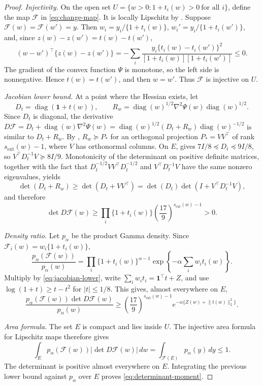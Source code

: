 \documentclass[11pt]{article}
\theoremstyle{definition}
\theoremstyle{remark}
\DeclareMathOperator{\diag}{diag}
\newcommand{\one}{\bm 1}
\newcommand{\norm}[1]{\lVert #1\rVert}
\newcommand{\abs}[1]{\lvert #1\rvert}
\newcommand{\sext}{s_{\mathrm{ext}}}
\begin{document}
\begin{proof}
\emph{Injectivity.}  On the open set
$U=\{w>0:1+t_i(w)>0\ \text{for all }i\}$, define the map $\mathcal F$ in
\eqref{eq:change-map}.  It is locally Lipschitz by .
Suppose $\mathcal F(w)=\mathcal F(w')=y$.  Then $w_i=y_i/\{1+t_i(w)\}$,
$w_i'=y_i/\{1+t_i(w')\}$, and, since $z(w)-z(w')=t(w)-t(w')$,
\[
 (w-w')^\top\{z(w)-z(w')\}
 =-\sum_i\frac{y_i\{t_i(w)-t_i(w')\}^2}
 {[1+t_i(w)][1+t_i(w')]}\le0.
\]
The gradient of the convex function $\Psi$ is monotone, so the left side is
nonnegative.  Hence $t(w)=t(w')$, and then $w=w'$.  Thus $\mathcal F$ is
injective on $U$.

\emph{Jacobian lower bound.}  At a point where the Hessian exists, let
\[
 D_t=\diag(\one+t(w)),\qquad
 R_w=\diag(w)^{1/2}\nabla^2\Psi(w)\diag(w)^{1/2}.
\]
Since $D_t$ is diagonal, the derivative
$D\mathcal F=D_t+\diag(w)\nabla^2\Psi(w)
=\diag(w)^{1/2}(D_t+R_w)\diag(w)^{-1/2}$ is similar to $D_t+R_w$.  By
, $R_w\succeq P_*$ for an orthogonal projection
$P_*=VV^\top$ of rank $\sext(w)-1$, where $V$ has orthonormal columns.  On
$E$,  gives $7I/8\preceq D_t\preceq9I/8$, so
$V^\top D_t^{-1}V\succeq8I/9$.  Monotonicity of the determinant on positive
definite matrices, together with the fact that
$D_t^{-1/2}VV^\top D_t^{-1/2}$ and $V^\top D_t^{-1}V$ have the same nonzero
eigenvalues, yields
\[
 \det(D_t+R_w)\ge\det(D_t+VV^\top)
 =\det(D_t)\det(I+V^\top D_t^{-1}V),
\]
and therefore
\begin{equation}\label{eq:jacobian-lower}
 \det D\mathcal F(w)
 \ge\prod_i\{1+t_i(w)\}
 \left(\frac{17}{9}\right)^{\sext(w)-1}>0.
\end{equation}

\emph{Density ratio.}  Let $p_\alpha$ be the product Gamma density.  Since
$\mathcal F_i(w)=w_i\{1+t_i(w)\}$,
\[
 \frac{p_\alpha(\mathcal F(w))}{p_\alpha(w)}
 =\prod_i\{1+t_i(w)\}^{\alpha-1}
   \exp\left\{-\alpha\sum_iw_it_i(w)\right\}.
\]
Multiply by \eqref{eq:jacobian-lower}, write
$\sum_iw_it_i=\one^\top t+Z$, and use $\log(1+t)\ge t-t^2$ for
$\abs{t}\le1/8$.  This gives, almost everywhere on $E$,
\[
 \frac{p_\alpha(\mathcal F(w))\det D\mathcal F(w)}{p_\alpha(w)}
 \ge\left(\frac{17}{9}\right)^{\sext(w)-1}
 e^{-\alpha\{Z(w)+\norm{t(w)}_2^2\}}.
\]

\emph{Area formula.}  The set $E$ is compact and lies inside $U$.  The
injective area formula for Lipschitz maps
\citep[Chapter 3]{evansgariepy2015} therefore gives
\[
 \int_Ep_\alpha(\mathcal F(w))\abs{\det D\mathcal F(w)}\,dw
 =\int_{\mathcal F(E)}p_\alpha(y)\,dy\le1.
\]
The determinant is positive almost everywhere on $E$.  Integrating the
previous lower bound against $p_\alpha$ over $E$ proves
\eqref{eq:determinant-moment}.
\end{proof}
\end{document}
